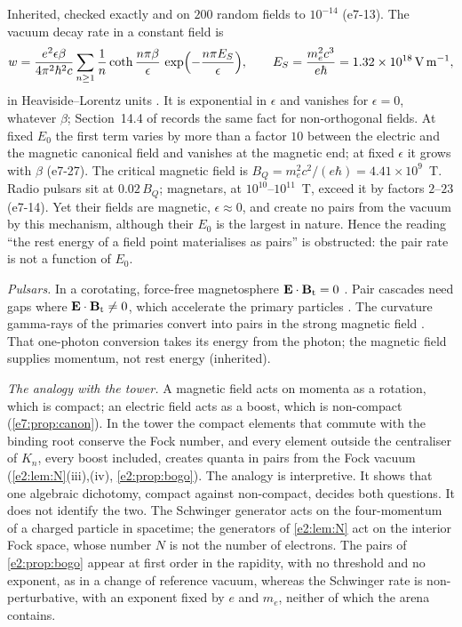 Inherited, checked exactly and on $200$ random fields to $10^{-14}$ (e7-13). The vacuum decay rate in a constant field is
\[
w=\frac{e^2\epsilon\beta}{4\pi^2\hbar^2c}\sum_{n\ge1}\frac1n\coth\frac{n\pi\beta}{\epsilon}\,\exp\Bigl(-\frac{n\pi E_S}{\epsilon}\Bigr),\qquad
E_S=\frac{m_e^2c^3}{e\hbar}=1.32\times10^{18}\,{\rm V\,m^{-1}},
\]
in Heaviside--Lorentz units \cite{Schwinger51,HeisenbergEuler36}. It is exponential in $\epsilon$ and vanishes for $\epsilon=0$, whatever $\beta$;
Section~14.4 of \cite{ES17} records the same fact for non-orthogonal fields. At fixed $E_0$ the first term varies by more than a factor $10$
between the electric and the magnetic canonical field and vanishes at the magnetic end; at fixed $\epsilon$ it grows with $\beta$ (e7-27). The
critical magnetic field is $B_Q=m_e^2c^2/(e\hbar)=4.41\times10^9$~T. Radio pulsars sit at $0.02\,B_Q$; magnetars, at $10^{10}$--$10^{11}$~T, exceed
it by factors $2$--$23$ \cite{KaspiBeloborodov17} (e7-14). Yet their fields are magnetic, $\epsilon\approx0$, and create no pairs from the vacuum by
this mechanism, although their $E_0$ is the largest in nature. Hence the reading ``the rest energy of a field point materialises as pairs'' is
obstructed: the pair rate is not a function of $E_0$.

\emph{Pulsars.} In a corotating, force-free magnetosphere $\mathbf E\cdot\mathbf B_{\rm t}=0$ \cite{GoldreichJulian69}. Pair cascades need gaps where
$\mathbf E\cdot\mathbf B_{\rm t}\neq0$, which accelerate the primary particles \cite{RudermanSutherland75}. The curvature gamma-rays of the primaries convert into
pairs in the strong magnetic field \cite{Sturrock71}. That one-photon conversion takes its energy from the photon; the magnetic field supplies
momentum, not rest energy (inherited).

\emph{The analogy with the tower.} A magnetic field acts on momenta as a rotation, which is compact; an electric field acts as a boost, which is
non-compact (\cref{e7:prop:canon}). In the tower the compact elements that commute with the binding root conserve the Fock number, and every
element outside the centraliser of $K_n$, every boost included, creates quanta in pairs from the Fock vacuum (\cref{e2:lem:N}(iii),(iv),
\cref{e2:prop:bogo}). The analogy is interpretive. It shows that one algebraic dichotomy, compact against non-compact, decides both questions. It
does not identify the two. The Schwinger generator acts on the four-momentum of a charged particle in spacetime; the generators of
\cref{e2:lem:N} act on the interior Fock space, whose number $N$ is not the number of electrons. The pairs of \cref{e2:prop:bogo} appear at first
order in the rapidity, with no threshold and no exponent, as in a change of reference vacuum, whereas the Schwinger rate is non-perturbative,
with an exponent fixed by $e$ and $m_e$, neither of which the arena contains.


